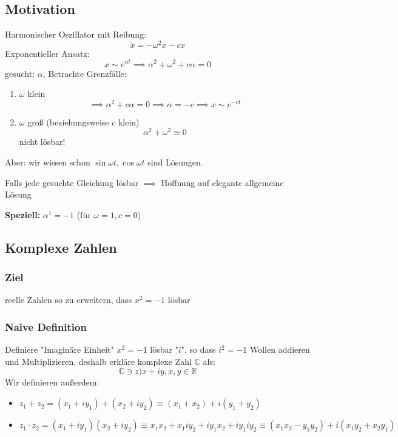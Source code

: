 \documentclass[a4paper]{scrartcl}
\theoremstyle{definition}
\theoremstyle{plain}
\theoremstyle{remark}
\theoremstyle{remark}
\newcommand{\I}{\ensuremath{i}}%
\begin{document}
\subsection*{Motivation}
   Harmonischer Oszillator mit Reibung:
   \[\ddot{x} = -\omega^2 x - c \dot{x}\]
   Exponentieller Ansatz:
   \[x\sim e^{\alpha t} \implies \alpha^2 + \omega^2 + c\alpha = 0\]
   gesucht: $\alpha$, Betrachte Grenzfälle:
\begin{enumerate}
\item $\omega$ klein
\[\implies \alpha^2 + c\alpha = 0 \implies \alpha = -c \implies x\sim e^{-c t}\]
\item $\omega$ groß (beziehungsweise $c$ klein)
\[\alpha^2 + \omega^2 \simeq 0\]
nicht lösbar!
\end{enumerate}
Aber: wir wissen schon $\sin{\omega t}, \cos{\omega t}$ sind Lösungen.

Falls jede gesuchte Gleichung lösbar $\implies$ Hoffnung auf elegante allgemeine Lösung

\textbf{Speziell:} $\alpha^1 = -1$ (für $\omega = 1, c = 0$)
\subsection{Komplexe Zahlen}
\label{sec-5-1}
\subsubsection{Ziel}
\label{sec-5-1-1}
reelle Zahlen so zu erweitern, dass $x^2 = - 1$ lösbar
\subsubsection{Naive Definition}
\label{sec-5-1-2}
Definiere "Imaginäre Einheit" $x^2 = -1$ lösbar "$\I$", so dass $\I^2 = -1$
Wollen addieren und Multiplizieren, deshalb erkläre komplexe Zahl $\mathbb{C}$ als:
\[\mathbb{C} \ni z ) x + \I y, x,y\in\mathbb{R}\]
Wir definieren außerdem:
\begin{itemize}
\item $z_1 + z_2 = (x_1 + \I y_1) + (x_2 + \I y_2) \equiv (x_1 + x_2) + \I(y_1 + y_2)$
\item $z_1 \cdot z_2 = (x_1 + \I y_1) (x_2 + \I y_2) \equiv x_1 x_2 + x_1 \I y_2 + \I y_1 x_2 + \I y_1 \I y_2 \equiv (x_1 x_2 - y_1 y_2) + i(x_1 y_2 + x_2 y_1)$
\end{itemize}
\end{document}
